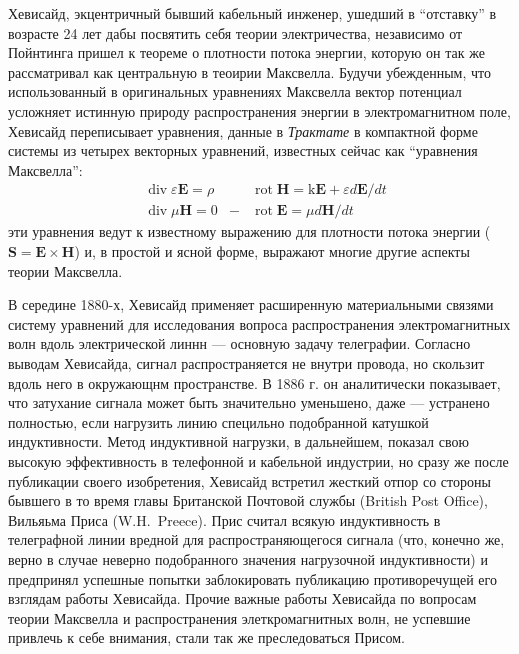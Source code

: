 \documentclass[12pt, oneside, a4paper]{article}
\begin{document}
Хевисайд, экцентричный бывший кабельный инженер, ушедший в ``отставку'' в возрасте 24 лет дабы посвятить себя теории электричества, независимо от Пойнтинга пришел к теореме о плотности потока энергии, которую он так же рассматривал как центральную в теоирии Максвелла. Будучи убежденным, что использованный в оригинальных уравнениях Максвелла вектор потенциал усложняет истинную природу распространения энергии в электромагнитном поле, Хевисайд переписывает уравнения, данные в \emph{Трактате} в компактной форме системы из четырех векторных уравнений, известных сейчас как ``уравнения Максвелла'':
\begin{align*}
&\operatorname{div}\varepsilon{}\mathbf{E} = \rho& 
&\operatorname{rot}\mathbf{H}=\mathrm{k}\mathbf{E} + \varepsilon{}d\mathbf{E}/dt\\
&\operatorname{div}\mu{}\mathbf{H}=0& 
-&\operatorname{rot}\mathbf{E}=\mu{}d\mathbf{H}/dt
\end{align*}
эти уравнения ведут к известному выражению для плотности потока энергии ($\mathbf{S}=\mathbf{E}\times\mathbf{H}$) и, в простой и ясной форме, выражают многие другие аспекты теории Максвелла.

В середине 1880-х, Хевисайд применяет расширенную материальными связями систему уравнений для исследования вопроса распространения электромагнитных волн вдоль электрической линнн --- основную задачу телеграфии. Согласно выводам Хевисайда, сигнал распространяется не внутри провода, но скользит вдоль него в окружающнм пространстве. В 1886 г. он аналитически показывает, что затухание сигнала может быть значительно уменьшено, даже --- устранено полностью, если нагрузить линию специльно подобранной катушкой индуктивности. Метод индуктивной нагрузки, в дальнейшем, показал свою высокую эффективность в телефонной и кабельной индустрии, но сразу же после публикации своего изобретения, Хевисайд встретил жесткий отпор со стороны бывшего в то время главы Британской Почтовой службы (British Post Office), Вильяьма Приса (W.H.~Preece). Прис считал всякую индуктивность в телеграфной линии вредной для распространяющегося сигнала (что, конечно же, верно в случае неверно подобранного значения нагрузочной индуктивности) и предпринял успешные попытки заблокировать публикацию противоречущей его взглядам работы Хевисайда. Прочие важные работы Хевисайда по вопросам теории Максвелла и распространения элеткромагнитных волн, не успевшие привлечь к себе внимания, стали так же преследоваться Присом.
\end{document}
